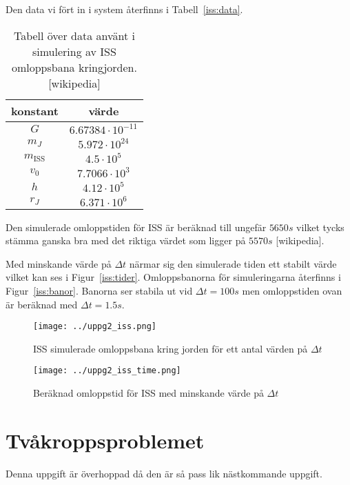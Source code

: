 \documentclass[a4]{article}
\begin{document}
Den data vi fört in i system återfinns i Tabell~\vref{iss:data}.
\begin{table}
\begin{center}
\begin{tabular}{c|c}
	konstant & värde \\
	\hline
	$G$       &  $6.67384 \cdot 10^{-11}$ \\
	$m_J$     &  $5.972 \cdot 10^{24}$ \\
	$m_{\mathrm{ISS}}$ &  $4.5 \cdot 10^5$ \\
	$v_0$     &  $7.7066 \cdot 10^3$ \\
	$h$       &  $4.12 \cdot 10^5$ \\
	$r_J$     &  $6.371 \cdot 10^6$
\end{tabular}
\caption{
Tabell över data använt i simulering av ISS omloppsbana
kringjorden.[wikipedia]}
\label{iss:data}
\end{center}
\end{table}

Den simulerade omloppstiden för ISS är beräknad till ungefär $5650s$ vilket
tycks stämma ganska bra med det riktiga värdet som ligger på $5570s$
[wikipedia].

Med minskande värde på $\Delta t$ närmar sig den simulerade tiden ett stabilt
värde vilket kan ses i Figur~\vref{iss:tider}.
Omloppsbanorna för simuleringarna återfinns i Figur~\vref{iss:banor}.
Banorna ser stabila ut vid $\Delta t = 100s$ men omloppstiden ovan är beräknad
med $\Delta t = 1.5s$.

\begin{figure}
\begin{center}
	\texttt{[image: ../uppg2\_iss.png]}
\end{center}
\caption{
	ISS simulerade omloppsbana kring jorden för ett antal värden på $\Delta t$
}
\label{iss:banor}
\end{figure}

\begin{figure}
\begin{center}
	\texttt{[image: ../uppg2\_iss\_time.png]}
\end{center}
\caption{
	Beräknad omloppstid för ISS med minskande värde på $\Delta t$
}
\label{iss:tider}
\end{figure}

\section{Tvåkroppsproblemet}
Denna uppgift är överhoppad då den är så pass lik nästkommande uppgift.
\end{document}
